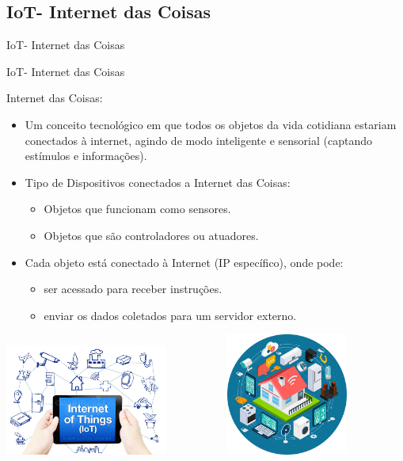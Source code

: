 \documentclass{beamer}
\begin{document}
\subsection{IoT- Internet das Coisas}
\begin{frame}{}
\begin{center}
  IoT- Internet das  Coisas

\end{center}

 \end{frame}














\begin{frame}{IoT- Internet das  Coisas }

Internet das Coisas:
\begin{itemize}
 \item Um conceito tecnológico em que todos os objetos da vida cotidiana estariam conectados à internet, agindo de modo inteligente e sensorial (captando estímulos e informações).
\item Tipo de Dispositivos conectados a Internet das Coisas:
\begin{itemize}
 \item Objetos que funcionam como sensores.
 \item Objetos que são controladores ou atuadores.
 
\end{itemize}
\item Cada objeto está conectado à Internet (IP específico), onde pode: 
\begin{itemize}
 \item ser acessado para receber instruções.
 \item enviar os dados coletados para um servidor externo. 
\end{itemize}
\end{itemize} 
\begin{center} 
  \includegraphics[width=0.4\textwidth]{img/IoT.jpg}\ \ \ \ \ \ \ \ \ \ \ 
  \includegraphics[width=0.3\textwidth]{img/IOT3.png}
\end{center}


   

\end{frame}
\end{document}
